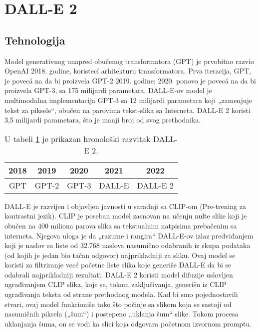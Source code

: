 \documentclass[a4paper]{article}
\begin{document}
\section{DALL-E 2}
\label{DALLE2}
\subsection{Tehnologija}
\label{subsec:tehnologija}

Model generativnog unapred obučenog transformatora (GPT) je prvobitno razvio OpenAI 2018. godine, koristecí arhitekturu transformatora. Prva iteracija, GPT, je povecá na da bi proizvela GPT-2 2019. godine; 2020. ponovo je povecá na da bi proizvela GPT-3, sa 175 milijardi parametara. DALL-E-ov model je multimodalna implementacija GPT-3 sa 12 milijardi parametara koji „zamenjuje tekst za piksele“, obučen na parovima tekst-slika sa Interneta. DALL-E 2 koristi 3,5 milijardi parametara, što je manji broj od svog prethodnika.



\begin{table}[h!]
\begin{center}
\caption{U tabeli \ref{tab:tabela1} je prikazan hronološki razvitak DALL-E 2.} 
\vspace{0.5cm}
\begin{tabular}{|c|c|c|c|c|} \hline
2018&2019&2020&2021&2022\\ \hline
GPT&GPT-2&GPT-3 &DALL-E&DALL-E 2\\ \hline
\end{tabular}
\label{tab:tabela1}
\end{center}
\end{table}

DALL-E je razvijen i objavljen javnosti u saradnji sa CLIP-om (Pre-trening za kontrastni jezik). CLIP je poseban model zasnovan na učenju nulte slike koji je obučen na 400 miliona parova slika sa tekstualnim natpisima prebačenim sa interneta. Njegova uloga je da „razume i rangira“ DALL-E-ov izlaz predviđanjem koji je naslov sa liste od 32.768 naslova nasumično odabranih iz skupa podataka (od kojih je jedan bio tačan odgovor) najprikladniji za sliku. Ovaj model se koristi za filtriranje vecé početne liste slika koje generiše DALL-E da bi se odabrali najprikladniji rezultati. DALL-E 2 koristi model difuzije uslovljen ugrađivanjem CLIP slika, koje se, tokom zaključivanja, generišu iz CLIP ugrađivanja teksta od strane prethodnog modela. Kad bi smo pojednostavili stvari, ovaj model funkcioniše tako što počinje sa slikom koja se sastoji od nasumičnih piksela („šum“) i postepeno „uklanja šum“ slike. Tokom procesa uklanjanja
šuma, on se vodi ka slici koja odgovara početnom izvornom promptu.
\end{document}
